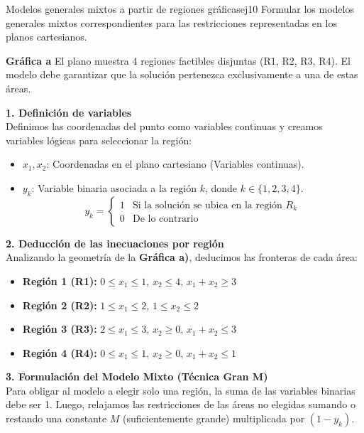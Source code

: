 \documentclass[10pt,a4paper]{article}
\begin{document}
\newpage

\begin{ejercicio}{Modelos generales mixtos a partir de regiones gráficas}{ej10}
Formular los modelos generales mixtos correspondientes para las restricciones representadas en los planos cartesianos.

\textbf{Gráfica a}
El plano muestra 4 regiones factibles disjuntas (R1, R2, R3, R4). El modelo debe garantizar que la solución pertenezca exclusivamente a una de estas áreas.
\end{ejercicio}

\vspace{0.4cm}
\textbf{1. Definición de variables}\\
Definimos las coordenadas del punto como variables continuas y creamos variables lógicas para seleccionar la región:
\begin{itemize}
    \item $x_1, x_2$: Coordenadas en el plano cartesiano (Variables continuas).
    \item $y_k$: Variable binaria asociada a la región $k$, donde $k \in \{1, 2, 3, 4\}$.
    \[ y_k = 
    \begin{cases} 
    1 & \text{Si la solución se ubica en la región } R_k \\
    0 & \text{De lo contrario}
    \end{cases} \]
\end{itemize}

\vspace{0.4cm}
\textbf{2. Deducción de las inecuaciones por región}\\
Analizando la geometría de la \textbf{Gráfica a)}, deducimos las fronteras de cada área:
\begin{itemize}
    \item \textbf{Región 1 (R1):} $0 \le x_1 \le 1$, \quad $x_2 \le 4$, \quad $x_1 + x_2 \ge 3$
    \item \textbf{Región 2 (R2):} $1 \le x_1 \le 2$, \quad $1 \le x_2 \le 2$
    \item \textbf{Región 3 (R3):} $2 \le x_1 \le 3$, \quad $x_2 \ge 0$, \quad $x_1 + x_2 \le 3$
    \item \textbf{Región 4 (R4):} $0 \le x_1 \le 1$, \quad $x_2 \ge 0$, \quad $x_1 + x_2 \le 1$
\end{itemize}

\vspace{0.4cm}
\textbf{3. Formulación del Modelo Mixto (Técnica Gran M)}\\
Para obligar al modelo a elegir solo una región, la suma de las variables binarias debe ser 1. Luego, relajamos las restricciones de las áreas no elegidas sumando o restando una constante $M$ (suficientemente grande) multiplicada por $(1 - y_k)$.
\end{document}
